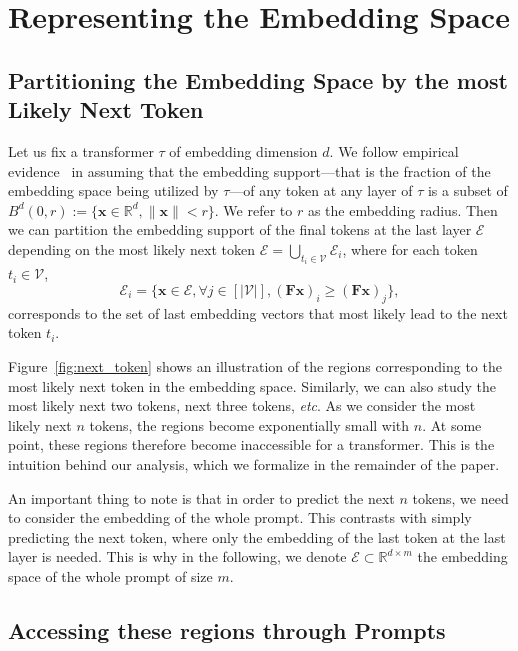 \section{Representing the Embedding Space}\label{sec:embed}

\subsection{Partitioning the Embedding Space by the most Likely Next Token}

Let us fix a transformer $\tau$ of embedding dimension $d$. We follow empirical evidence~\citep{brody-etal-2023-expressivity} in assuming that the embedding support---that is the fraction of the embedding space being utilized by $\tau$---of any token at any layer of $\tau$ is a subset of $B^d(0,r):=\{\mathbf x\in\mathbb R^{d},\|\mathbf x\|<r\}$. We refer to $r$ as the embedding radius. Then we can partition the embedding support of the final tokens at the last layer $\mathcal E$ depending on the most likely next token $\mathcal E=\bigcup_{t_i\in\mathcal V}\mathcal E_i$, where for each token $t_i\in\mathcal V$, $$\mathcal E_i=\{\mathbf x\in\mathcal E,\forall j\in[|\mathcal V|], (\mathbf F\mathbf x)_i\geq (\mathbf F\mathbf x)_j\},$$ corresponds to the set of last embedding vectors that most likely lead to the next token $t_i$. 

Figure~\ref{fig:next_token} shows an illustration of the regions corresponding to the most likely next token in the embedding space. Similarly, we can also study the most likely next two tokens, next three tokens, \emph{etc}. As we consider the most likely next $n$ tokens, the regions become exponentially small with $n$. At some point, these regions therefore become inaccessible for a transformer. This is the intuition behind our analysis, which we formalize in the remainder of the paper.

\begin{remark}
    An important thing to note is that in order to predict the next $n$ tokens, we need to consider the embedding of the whole prompt.
    This contrasts with simply predicting the next token, where only the embedding of the last token at the last layer is needed. This is why in the following, we denote $\mathcal E\subset\mathbb R^{d\times m}$ the embedding space of the whole prompt of size $m$.
\end{remark}

\subsection{Accessing these regions through Prompts}

